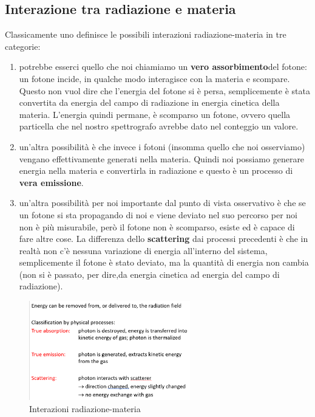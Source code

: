\documentclass[a4paper,11pt]{article}
\begin{document}
\subsection{Interazione tra radiazione e materia}
Classicamente uno definisce le possibili interazioni radiazione-materia in tre categorie:
\begin{enumerate}
    \item potrebbe esserci quello che noi chiamiamo un \textbf{vero assorbimento}del fotone: un fotone incide, in qualche modo interagisce con la materia e scompare. Questo non vuol dire che l'energia del fotone si è persa, semplicemente è stata convertita da energia del campo di radiazione in energia cinetica della materia. L'energia quindi permane, è scomparso un fotone, ovvero quella particella che nel nostro spettrografo avrebbe dato nel conteggio un valore.
    \item un'altra possibilità è che invece i fotoni (insomma quello che noi osserviamo) vengano effettivamente generati nella materia. Quindi noi possiamo generare energia nella materia e convertirla in radiazione e questo è un processo di \textbf{vera emissione}.
    \item un'altra possibilità per noi importante dal punto di vista osservativo è che se un fotone si sta propagando di noi e viene deviato nel suo percorso per noi non è più misurabile, però il fotone non è scomparso, esiste ed è capace di fare altre cose. La differenza dello \textbf{scattering} dai processi precedenti è che in realtà non c'è nessuna variazione di energia all'interno del sistema, semplicemente il fotone è stato deviato, ma la quantità di energia non cambia (non si è passato, per dire,da energia cinetica ad energia del campo di radiazione).
\end{enumerate}
\begin{figure}
\centering
    \includegraphics[width=7cm]{28-10.1(interazione_radiazione-materia).png}
    \caption{Interazioni radiazione-materia}
    \label{fig:28-10.1(interazione_radiazione-materia)}
\end{figure}
\end{document}
